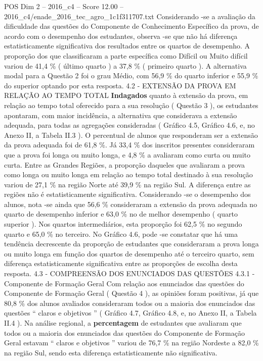 \begin{textsample}{POS Dim 2 – 2016\_c4 – Score 12.00 – 2016\_c4/enade\_2016\_tec\_agro\_1c1f311707.txt}
Considerando -se a avaliação da dificuldade das questões do Componente de Conhecimento Específico da prova, de acordo com o desempenho dos estudantes, observa -se que não há diferença estatisticamente significativa dos resultados entre os quartos de desempenho.
A proporção dos que classificaram a parte específica como Difícil ou Muito difícil variou de 41,4 \% ( último quarto ) a 37,8 \% ( primeiro quarto ).
A alternativa modal para a Questão 2 foi o grau Médio, com 56,9 \% do quarto inferior e 55,9 \% do superior optando por esta resposta. 4.2 - EXTENSÃO DA PROVA EM RELAÇÃO AO TEMPO TOTAL \textbf{Indagados} quanto à extensão da prova, em relação ao tempo total oferecido para a sua resolução ( Questão 3 ), os estudantes apontaram, com maior incidência, a alternativa que considerava a extensão adequada, para todas as agregações consideradas ( Gráfico 4.5, Gráfico 4.6, e, no Anexo II, a Tabela II.3 ).
O percentual de alunos que responderam ser a extensão da prova adequada foi de 61,8 \%.
Já 33,4 \% dos inscritos presentes consideraram que a prova foi longa ou muito longa, e 4,8 \% a avaliaram como curta ou muito curta.
Entre as Grandes Regiões, a proporção daqueles que avaliaram a prova como longa ou muito longa em relação ao tempo total destinado à sua resolução variou de 27,1 \% na região Norte até 39,9 \% na região Sul.
A diferença entre as regiões não é estatisticamente significativa.
Considerando -se o desempenho dos alunos, nota -se ainda que 56,6 \% consideraram a extensão da prova adequada no quarto de desempenho inferior e 63,0 \% no de melhor desempenho ( quarto superior ).
Nos quartos intermediários, esta proporção foi 62,5 \% no segundo quarto e 65,0 \% no terceiro.
No Gráfico 4.6, pode -se constatar que há uma tendência decrescente da proporção de estudantes que consideraram a prova longa ou muito longa em função dos quartos de desempenho até o terceiro quarto, sem diferença estatisticamente significativa entre as proporções de escolha desta resposta. 4.3 - COMPREENSÃO DOS ENUNCIADOS DAS QUESTÕES 4.3.1 - Componente de Formação Geral Com relação aos enunciados das questões do Componente de Formação Geral ( Questão 4 ), as opiniões foram positivas, já que 80,8 \% dos alunos avaliados consideraram todos ou a maioria dos enunciados das questões “ claros e objetivos ” ( Gráfico 4.7, Gráfico 4.8, e, no Anexo II, a Tabela II.4 ).
Na análise regional, a \textbf{percentagem} de estudantes que avaliaram que todos ou a maioria dos enunciados das questões do Componente de Formação Geral estavam “ claros e objetivos ” variou de 76,7 \% na região Nordeste a 82,0 \% na região Sul, sendo esta diferença estatisticamente não significativa.

\end{textsample}
